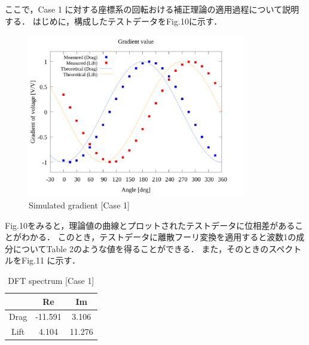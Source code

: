 ここで，Case 1 に対する座標系の回転おける補正理論の適用過程について説明する．
はじめに，構成したテストデータをFig.10に示す．

\begin{figure}[htbp]

  \begin{center}
    \includegraphics[width=95mm]{../../02_workspace/result/rotation_tx=15.0_ty=20.0/plot/20/20_adjust-value.png}
    \caption{Simulated gradient [Case 1]}
  \end{center}
\end{figure}

\newpage

Fig.10をみると，理論値の曲線とプロットされたテストデータに位相差があることがわかる．
このとき，テストデータに離散フーリ変換を適用すると波数1の成分についてTable 2のような値を得ることができる．
また，そのときのスペクトルをFig.11 に示す．

\begin{table}[htbp]
  \begin{center}
    \caption{DFT spectrum [Case 1]}
    \begin{tabular}{|p{30mm}|p{20mm}|p{20mm}|}
      \hline
      \multicolumn{1}{|c|}{}     & \multicolumn{1}{|c|}{Re}      & \multicolumn{1}{|c|}{Im}     \\ \hline
      \multicolumn{1}{|c|}{Drag} & \multicolumn{1}{|c|}{-11.591} & \multicolumn{1}{|c|}{3.106}  \\ \hline
      \multicolumn{1}{|c|}{Lift} & \multicolumn{1}{|c|}{4.104}   & \multicolumn{1}{|c|}{11.276} \\ \hline
    \end{tabular}
  \end{center}
\end{table}

